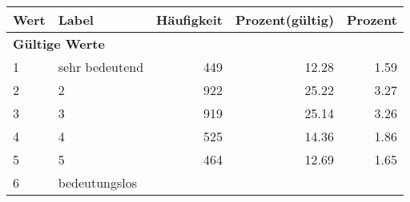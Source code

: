      \begin{longtable}{lXrrr}
     \toprule
     \textbf{Wert} & \textbf{Label} & \textbf{Häufigkeit} & \textbf{Prozent(gültig)} & \textbf{Prozent} \\
     \endhead
     \midrule
     \multicolumn{5}{l}{\textbf{Gültige Werte}}\\

     1 &
     \multicolumn{1}{X}{ sehr bedeutend   } &


       \num{449} &
       \num[round-mode=places,round-precision=2]{12.28} &
         \num[round-mode=places,round-precision=2]{1.59} \\

     2 &
     \multicolumn{1}{X}{ 2   } &


       \num{922} &
       \num[round-mode=places,round-precision=2]{25.22} &
         \num[round-mode=places,round-precision=2]{3.27} \\

     3 &
     \multicolumn{1}{X}{ 3   } &


       \num{919} &
       \num[round-mode=places,round-precision=2]{25.14} &
         \num[round-mode=places,round-precision=2]{3.26} \\

     4 &
     \multicolumn{1}{X}{ 4   } &


       \num{525} &
       \num[round-mode=places,round-precision=2]{14.36} &
         \num[round-mode=places,round-precision=2]{1.86} \\

     5 &
     \multicolumn{1}{X}{ 5   } &


       \num{464} &
       \num[round-mode=places,round-precision=2]{12.69} &
         \num[round-mode=places,round-precision=2]{1.65} \\

     6 &
     \multicolumn{1}{X}{ bedeutungslos   } &



\end{longtable}
